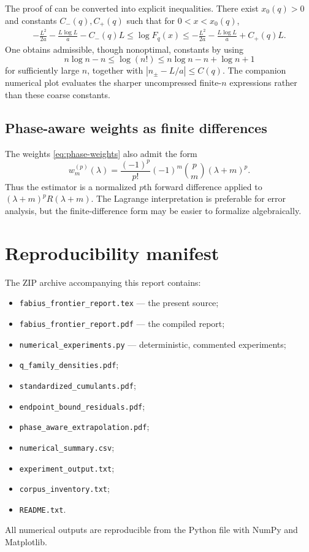 \documentclass[11pt,oneside]{article}
\theoremstyle{definition}
\theoremstyle{remark}
\begin{document}
The proof of  can be converted into explicit inequalities.  There exist
$x_0(q)>0$ and constants $C_-(q),C_+(q)$ such that for $0<x<x_0(q)$,
\begin{align*}
 -\frac{L^2}{2a}-\frac{L\log L}{a}-C_-(q)L
 \le\log F_q(x)
 \le-\frac{L^2}{2a}-\frac{L\log L}{a}+C_+(q)L.
\end{align*}
One obtains admissible, though nonoptimal, constants by using
\[
 n\log n-n\le\log(n!)\le n\log n-n+\log n+1
\]
for sufficiently large $n$, together with
$|n_\pm-L/a|\le C(q)$.  The companion numerical plot evaluates the sharper uncompressed
finite-$n$ expressions rather than these coarse constants.

\subsection{Phase-aware weights as finite differences}

The weights \eqref{eq:phase-weights} also admit the form
\[
 w_m^{(p)}(\lambda)
 =\frac{(-1)^p}{p!}(-1)^m\binom pm(\lambda+m)^p.
\]
Thus the estimator is a normalized $p$th forward difference applied to
$(\lambda+m)^pR(\lambda+m)$.  The Lagrange interpretation is preferable for error analysis,
but the finite-difference form may be easier to formalize algebraically.

\section{Reproducibility manifest}
\label{app:manifest}

The ZIP archive accompanying this report contains:
\begin{itemize}
\item \texttt{fabius\_frontier\_report.tex} --- the present source;
\item \texttt{fabius\_frontier\_report.pdf} --- the compiled report;
\item \texttt{numerical\_experiments.py} --- deterministic, commented experiments;
\item \texttt{q\_family\_densities.pdf};
\item \texttt{standardized\_cumulants.pdf};
\item \texttt{endpoint\_bound\_residuals.pdf};
\item \texttt{phase\_aware\_extrapolation.pdf};
\item \texttt{numerical\_summary.csv};
\item \texttt{experiment\_output.txt};
\item \texttt{corpus\_inventory.txt};
\item \texttt{README.txt}.
\end{itemize}
All numerical outputs are reproducible from the Python file with NumPy and Matplotlib.
\end{document}
